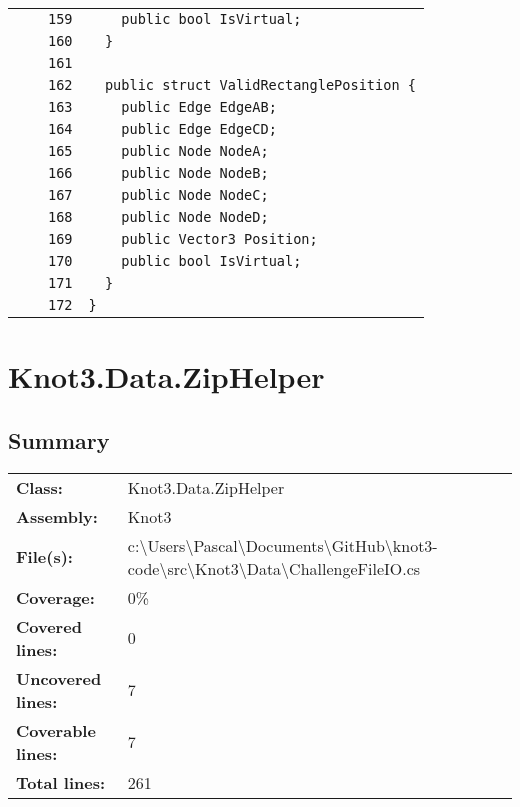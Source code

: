 \documentclass[a4paper,10pt]{article}
\begin{document}
\begin{longtable}[l]{lrrl}
\cellcolor{gray} &  & \verb~159~ & \verb~    public bool IsVirtual;~\\
\cellcolor{gray} &  & \verb~160~ & \verb~  }~\\
\cellcolor{gray} &  & \verb~161~ & \verb~~\\
\cellcolor{gray} &  & \verb~162~ & \verb~  public struct ValidRectanglePosition {~\\
\cellcolor{gray} &  & \verb~163~ & \verb~    public Edge EdgeAB;~\\
\cellcolor{gray} &  & \verb~164~ & \verb~    public Edge EdgeCD;~\\
\cellcolor{gray} &  & \verb~165~ & \verb~    public Node NodeA;~\\
\cellcolor{gray} &  & \verb~166~ & \verb~    public Node NodeB;~\\
\cellcolor{gray} &  & \verb~167~ & \verb~    public Node NodeC;~\\
\cellcolor{gray} &  & \verb~168~ & \verb~    public Node NodeD;~\\
\cellcolor{gray} &  & \verb~169~ & \verb~    public Vector3 Position;~\\
\cellcolor{gray} &  & \verb~170~ & \verb~    public bool IsVirtual;~\\
\cellcolor{gray} &  & \verb~171~ & \verb~  }~\\
\cellcolor{gray} &  & \verb~172~ & \verb~}~\\
\end{longtable}
\newpage
\section{Knot3.Data.ZipHelper}
\subsection{Summary}
\begin{longtable}[l]{ll}
\textbf{Class:} & Knot3.Data.ZipHelper\\
\textbf{Assembly:} & Knot3\\
\textbf{File(s):} & \begin{minipage}[t]{12cm}{c:\textbackslash Users\textbackslash Pascal\textbackslash Documents\textbackslash GitHub\textbackslash knot3-code\textbackslash src\textbackslash Knot3\textbackslash Data\textbackslash ChallengeFileIO.cs}\end{minipage} \\
\textbf{Coverage:} & 0\%\\
\textbf{Covered lines:} & 0\\
\textbf{Uncovered lines:} & 7\\
\textbf{Coverable lines:} & 7\\
\textbf{Total lines:} & 261\\
\end{longtable}
\end{document}
